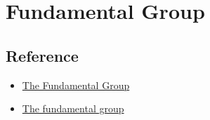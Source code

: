 \chapter{Fundamental Group}\label{chp:4_2}

\section{Reference}

\begin{itemize}
    \item \href{https://pillowmath.github.io/Math%20142/Lec10.pdf}{The Fundamental Group}
    \item \href{https://www.ms.uky.edu/~guillou/F17/551Notes-Week15.pdf}{The fundamental group}
\end{itemize}